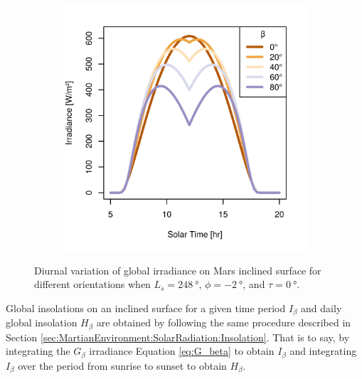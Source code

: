 \begin{figure}[h]
\begin{subfigure}[t]{\subfigureWidth}
  		\label{fig:sub:irradiance-inclined-gamma-c-m180}
  	\end{subfigure}\hfill
	   \begin{subfigure}[t]{\subfigureWidth}
      \centering
  		\includegraphics[height=\graphicsHeight]{sections/mars-solar-energy/solar-radiation/plots/gi-variationfor-ls-248-phi-2-tau-05-gammac-west-and-albedo-027.png}
  		\label{fig:sub:irradiance-inclined-gamma-c-90}
	   \end{subfigure}\hfill
	\caption{Diurnal variation of global irradiance on Mars inclined surface for different orientations when $L_{s} = \SI{248}{\degree}$, $\phi = \SI{-2}{\degree}$, and $\tau = \SI{0}{\degree}$.}
	\label{fig:plot:irradiance-inclined-gamma-c}
\vspace{-2ex}
\end{figure}

\clearpage

Global insolations on an inclined surface for a given time period $I_{\beta}$ and daily global insolation $H_{\beta}$ are obtained by following the same procedure described in Section \ref{sec:MartianEnvironment:SolarRadiation:Insolation}. That is to say, by integrating the $G_{\beta}$ irradiance Equation \ref{eq:G_beta} to obtain $I_{\beta}$ and integrating $I_{\beta}$ over the period from sunrise to sunset to obtain $H_{\beta}$.

